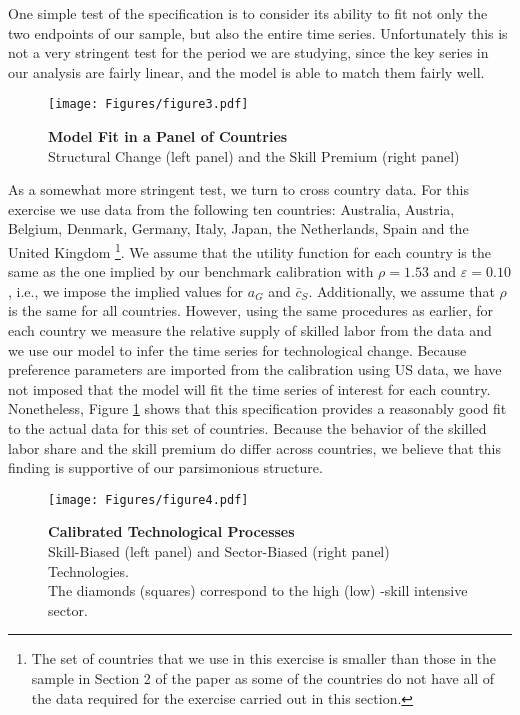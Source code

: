 \documentclass[10pt]{article}
\begin{document}
One simple test of the specification is to consider its ability to fit not
only the two endpoints of our sample, but also the entire time series.
Unfortunately this is not a very stringent test for the period we are
studying, since the key series in our analysis are fairly linear, and the
model is able to match them fairly well.

\begin{figure}[!hbt]
\centering
\caption{\centering \textbf{Model Fit in a Panel of Countries}\\ Structural Change (left panel) and the Skill Premium (right panel)}
\texttt{[image: Figures/figure3.pdf]} 
\label{fig:figure3}
\end{figure}

As a somewhat more stringent test, we turn to cross country data. For this
exercise we use data from the following ten countries: Australia, Austria,
Belgium, Denmark, Germany, Italy, Japan, the Netherlands, Spain and the
United Kingdom \footnote{%
The set of countries that we use in this exercise is smaller than those in the sample
in Section 2 of the paper as some of the countries do not have all of the data required
for the exercise carried out in this section.}. We assume that the utility
function for each country is the same as the one implied by our benchmark
calibration with $\rho =1.53$ and $\varepsilon =0.10$, i.e., we impose the
implied values for $a_{G}$ and $\bar{c}_{S}$. Additionally, we assume that $\rho$ 
is the same for all countries. However, using the same procedures as
earlier, for each country we measure the relative supply of skilled labor
from the data and we use our model to infer the time series for
technological change. Because preference parameters are imported from the
calibration using US data, we have not imposed that the model will fit the
time series of interest for each country. Nonetheless, Figure \ref{fig:figure3} shows that
this specification provides a reasonably good fit to the actual data for
this set of countries. Because the behavior of the skilled labor share and
the skill premium do differ across countries, we believe that this finding
is supportive of our parsimonious structure.

\begin{figure}[!hbt]
\centering
\caption{\centering \textbf{Calibrated Technological Processes} \\ Skill-Biased (left panel) and Sector-Biased (right panel) Technologies.\\ The diamonds (squares) correspond to the high (low) -skill intensive sector.}
\texttt{[image: Figures/figure4.pdf]} 
\label{fig:figure4}
\end{figure}
\end{document}
